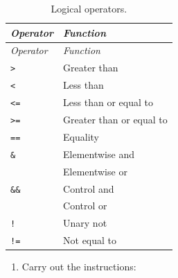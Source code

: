 \documentclass[
]{book}
\providecommand{\tightlist}{%
  \setlength{\itemsep}{0pt}\setlength{\parskip}{0pt}}
\begin{document}
\begin{longtable}[]{@{}
  >{\raggedright\arraybackslash}p{}
  >{\raggedright\arraybackslash}p{}@{}}
\caption{\label{tab:LogicOperators} Logical operators.}\tabularnewline
\toprule\noalign{}
\begin{minipage}[b]{\linewidth}\raggedright
\emph{{Operator}}
\end{minipage} & \begin{minipage}[b]{\linewidth}\raggedright
\emph{{Function}}
\end{minipage} \\
\midrule\noalign{}
\endfirsthead
\toprule\noalign{}
\begin{minipage}[b]{\linewidth}\raggedright
\emph{{Operator}}
\end{minipage} & \begin{minipage}[b]{\linewidth}\raggedright
\emph{{Function}}
\end{minipage} \\
\midrule\noalign{}
\endhead
\bottomrule\noalign{}
\endlastfoot
\texttt{\textgreater{}} & Greater than \\
\texttt{\textless{}} & Less than \\
\texttt{\textless{}=} & Less than or equal to \\
\texttt{\textgreater{}=} & Greater than or equal to \\
\texttt{==} & Equality \\
\texttt{\&} & Elementwise and \\
\texttt{\textbar{}} & Elementwise or \\
\texttt{\&\&} & Control and \\
\texttt{\textbar{}\textbar{}} & Control or \\
\texttt{!} & Unary not \\
\texttt{!=} & Not equal to \\
\end{longtable}

\begin{enumerate}
\def\labelenumi{(\alph{enumi})}
\setcounter{enumi}{3}
\tightlist
\item
  Carry out the instructions:
\end{enumerate}
\end{document}
